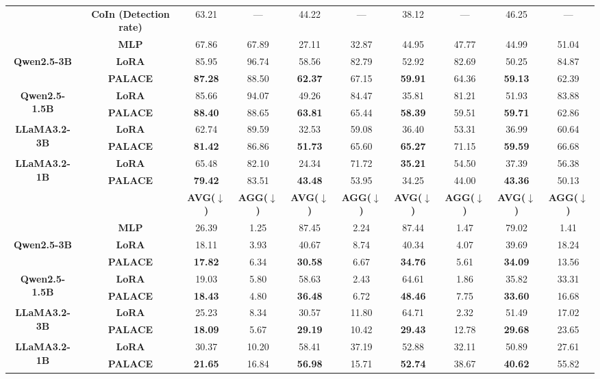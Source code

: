 \documentclass[pdflatex,sn-mathphys-num]{sn-jnl}%
\theoremstyle{thmstyleone}%
\theoremstyle{thmstyletwo}%
\theoremstyle{thmstylethree}%
\providecommand{\DIFaddendFL}{} %
\begin{document}
\begin{table}[t]
{\begin{tabular}{cc|cc|cc|cc|cc}
\midrule
& \textbf{CoIn (Detection rate)} &63.21&---&44.22&---&38.12&---&46.25&---\\
& \textbf{MLP} & 67.86 & 67.89 & 27.11 & 32.87 & 44.95 & 47.77 & 44.99 & 51.04 \\
\midrule
\multirow{2}{*}{\textbf{Qwen2.5-3B}}
& \textbf{LoRA} & 85.95 & 96.74 & 58.56 & 82.79 & 52.92 & 82.69 & 50.25 & 84.87 \\
& \textbf{PALACE} &\textbf{87.28}&88.50&\textbf{62.37}&67.15&\textbf{59.91}&64.36&\textbf{59.13}&62.39 \\
\midrule
\multirow{2}{*}{\textbf{Qwen2.5-1.5B}}
& \textbf{LoRA} &85.66&94.07&49.26&84.47& 35.81 & 81.21 & 51.93 & 83.88 \\
& \textbf{PALACE} & \textbf{88.40} &88.65& \textbf{63.81} &65.44& \textbf{58.39} &59.51& \textbf{59.71} & 62.86\\
\midrule
\multirow{2}{*}{\textbf{LLaMA3.2-3B}}
& \textbf{LoRA} &62.74&89.59&32.53&59.08&36.40&53.31&36.99&60.64\\
& \textbf{PALACE} &\textbf{81.42}&86.86&\textbf{51.73}&65.60&\textbf{65.27}&71.15&\textbf{59.59}&66.68\\
\midrule
\multirow{2}{*}{\textbf{LLaMA3.2-1B}}
& \textbf{LoRA} &65.48&82.10&24.34&71.72&\textbf{35.21}&54.50&37.39&56.38\\
& \textbf{PALACE} &\textbf{79.42}&83.51&\textbf{43.48}&53.95&34.25&44.00&\textbf{43.36}&50.13\\
\midrule
\midrule
& & \textbf{AVG($\downarrow$)} & \textbf{AGG($\downarrow$)} & \textbf{AVG($\downarrow$)} & \textbf{AGG($\downarrow$)} & \textbf{AVG($\downarrow$)} & \textbf{AGG($\downarrow$)} & \textbf{AVG($\downarrow$)} & \textbf{AGG($\downarrow$)} \\
\midrule
& \textbf{MLP} & 26.39 & 1.25 & 87.45 & 2.24 &87.44 &1.47 & 79.02 & 1.41 \\
\midrule
\multirow{2}{*}{\textbf{Qwen2.5-3B}}
& \textbf{LoRA} & 18.11 & 3.93 & 40.67 & 8.74 & 40.34 & 4.07 & 39.69 & 18.24 \\
& \textbf{PALACE} &\textbf{17.82}&6.34&\textbf{30.58}&6.67&\textbf{34.76}&5.61&\textbf{34.09}&13.56\\
\midrule
\multirow{2}{*}{\textbf{Qwen2.5-1.5B}}
& \textbf{LoRA} &19.03&5.80&58.63&2.43& 64.61 & 1.86 & 35.82 & 33.31 \\
& \textbf{PALACE} & \textbf{18.43} & 4.80 & \textbf{36.48} & 6.72 & \textbf{48.46} & 7.75 & \textbf{33.60} & 16.68 \\
\midrule
\multirow{2}{*}{\textbf{LLaMA3.2-3B}}
& \textbf{LoRA} &25.23&8.34&30.57&11.80&64.71&2.32&51.49&17.02\\
& \textbf{PALACE} &\textbf{18.09}&5.67&\textbf{29.19}&10.42&\textbf{29.43}&12.78&\textbf{29.68}&23.65\\
\midrule
\multirow{2}{*}{\textbf{LLaMA3.2-1B}}
& \textbf{LoRA} &30.37&10.20&58.41&37.19&52.88&32.11&50.89&27.61\\
& \textbf{PALACE} &\textbf{21.65}&16.84&\textbf{56.98}&15.71&\textbf{52.74}&38.67&\textbf{40.62}&55.82\\
\bottomrule
\end{tabular}}
\DIFaddendFL \vspace{-2mm}
\end{table}
\end{document}
